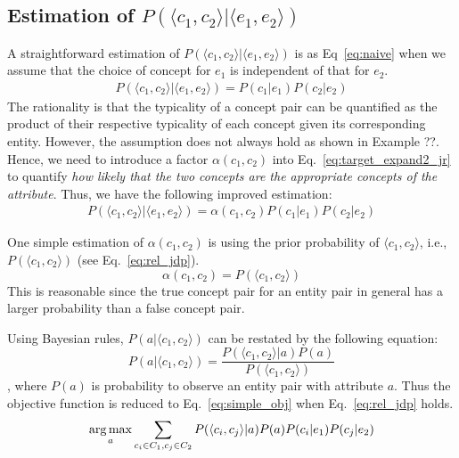 \subsection{Estimation of $P(\langle c_1,c_2\rangle | \langle e_1,e_2\rangle)$ }
A straightforward estimation of $P( \langle c_{1},c_{2} \rangle | \langle e_{1},e_{2} \rangle )$ is as Eq~\ref{eq:naive} when we assume that the choice of concept for $e_1$ is independent of that for $e_2$.
\begin{equation}
\label{eq:naive}
\begin{split}
P(\langle c_{1},c_{2}\rangle |\langle e_{1},e_{2} \rangle) = P(c_1|e_1) P(c_2|e_2)
\end{split}
\end{equation} The rationality is that the typicality of a concept pair can be quantified as the product of their respective typicality of each concept given its corresponding entity.
However, the assumption does not always hold as shown in Example ??. Hence, we need to introduce a factor $\alpha(c_1,c_2)$ into Eq.~\ref{eq:target_expand2_jr} to quantify {\it how likely that the two concepts are the appropriate concepts of the attribute}. Thus, we have the following improved estimation:
\begin{equation}
\label{eq:target_expand2_jr}
\begin{split}
P(\langle c_{1},c_{2}\rangle |\langle e_{1},e_{2} \rangle) = \alpha(c_1,c_2)  P(c_1|e_1)  P(c_2|e_2)
\end{split}
\end{equation}


One simple estimation of $\alpha(c_1,c_2)$ is using the prior probability of $\langle c_1, c_2\rangle$, i.e., $P(\langle c_1,c_2\rangle)$ (see Eq.~\ref{eq:rel_jdp}).
\begin{equation}\label{eq:rel_jdp}
  \alpha(c_1,c_2) = P(\langle c_1, c_2\rangle)
\end{equation}
This is reasonable since the true concept pair for an entity pair in general has a larger probability than
a false concept pair.

Using Bayesian rules, $P(a| \langle c_{1},c_{2} \rangle )$ can be restated by the following equation:
\begin{equation}
\label{eq:target_expand1}
P(a|\langle c_{1},c_{2} \rangle)= \frac{ P(\langle c_{1},c_{2}\rangle|a)P(a) }{ P(\langle c_{1},c_{2}\rangle) }
\end{equation},
where $P(a)$ is probability to observe an entity pair with attribute $a$.
Thus the objective function is reduced to Eq.~\ref{eq:simple_obj} when Eq.~\ref{eq:rel_jdp} holds.
\begin{equation}
\label{eq:simple_obj}
 \operatorname*{arg\,max}_a \sum_{c_i\in C_1, c_j\in C_2} P(\langle c_{i},c_{j}\rangle |a) P(a) P(c_i|e_1) P(c_j|e_2)
\end{equation}




